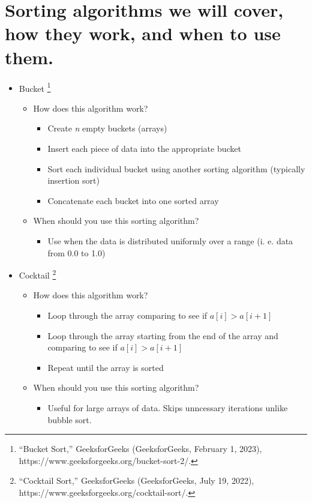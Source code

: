 \documentclass[11pt]{article}
\begin{document}
\section{Sorting algorithms we will cover, how they work, and when to use them.}
\begin{itemize}
\addtolength{\itemindent}{0.80cm}
\itemsep0em 

\item{Bucket}
\footnote{“Bucket Sort,” GeeksforGeeks (GeeksforGeeks, February 1, 2023), https://www.geeksforgeeks.org/bucket-sort-2/.}
\begin{itemize}
\addtolength{\itemindent}{0.80cm}
\itemsep0em 
\item{How does this algorithm work?}
\begin{itemize}
\addtolength{\itemindent}{0.80cm}
\itemsep0em 
\item{Create \emph{n} empty buckets (arrays)}
\item{Insert each piece of data into the appropriate bucket}
\item{Sort each individual bucket using another sorting algorithm (typically insertion sort)}
\item{Concatenate each bucket into one sorted array}
\end{itemize}
\item{When should you use this sorting algorithm?}
\begin{itemize}
\addtolength{\itemindent}{0.80cm}
\itemsep0em 
\item{Use when the data is distributed uniformly over a range (i. e. data from 0.0 to 1.0)}
\end{itemize}
\end{itemize}


\item{Cocktail}
\footnote{“Cocktail Sort,” GeeksforGeeks (GeeksforGeeks, July 19, 2022), https://www.geeksforgeeks.org/cocktail-sort/.}
\begin{itemize}
\addtolength{\itemindent}{0.80cm}
\itemsep0em 
\item{How does this algorithm work?}
\begin{itemize}
\addtolength{\itemindent}{0.80cm}
\itemsep0em 
\item{Loop through the array comparing to see if $ a[i] > a[i+1] $ }
\item{Loop through the array starting from the end of the array and comparing to see if $ a[i] > a[i+1] $}
\item{Repeat until the array is sorted}
\end{itemize}
\item{When should you use this sorting algorithm?}
\begin{itemize}
\addtolength{\itemindent}{0.80cm}
\itemsep0em 
\item{Useful for large arrays of data. Skips unncessary iterations unlike bubble sort.}
\end{itemize}
\end{itemize}


\end{itemize}
\end{document}
